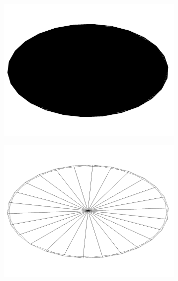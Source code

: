 \begin{figure}
  \begin{center}
    \begin{subfigure}{0.4\textwidth}
    \includegraphics[width=\linewidth]{assets/images/shapes/bugold/no_height}
    \caption{}
    \end{subfigure}
    \begin{subfigure}{0.4\textwidth}
    \includegraphics[width=\linewidth]{assets/images/shapes/bugold/no_height_w}
    \caption{}
    \end{subfigure}
    \begin{subfigure}{0.4\textwidth}

\end{subfigure}
\end{center}
\end{figure}
